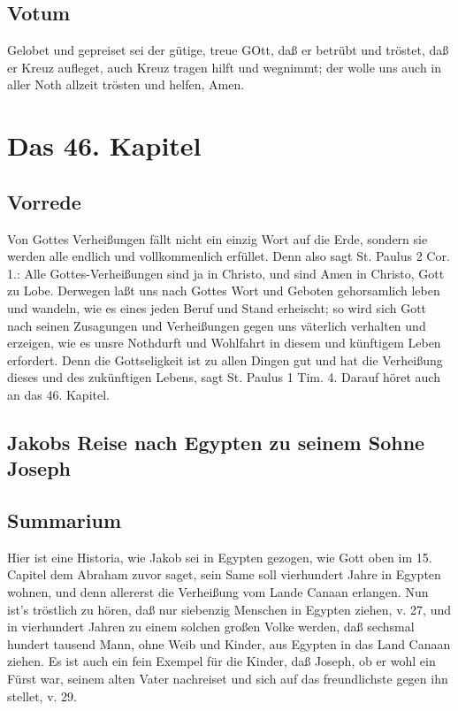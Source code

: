 \section{Votum}

Gelobet und gepreiset sei der gütige, treue GOtt, daß er betrübt und tröstet, daß er Kreuz aufleget, auch Kreuz tragen hilft und wegnimmt; der wolle uns auch in aller Noth allzeit trösten und helfen, Amen.

\chapter{Das 46. Kapitel}

\section{Vorrede}

Von Gottes Verheißungen fällt nicht ein einzig Wort auf die Erde, sondern sie werden alle endlich und vollkommenlich erfüllet. Denn also sagt St. Paulus 2 Cor. 1.: Alle Gottes-Verheißungen sind ja in Christo, und sind Amen in Christo, Gott zu Lobe. Derwegen laßt uns nach Gottes Wort und Geboten gehorsamlich leben und wandeln, wie es eines jeden Beruf und Stand erheischt; so wird sich Gott nach seinen Zusagungen und Verheißungen gegen uns väterlich verhalten und erzeigen, wie es unsre Nothdurft und Wohlfahrt in diesem und künftigem Leben erfordert. Denn die Gottseligkeit ist zu allen Dingen gut und hat die Verheißung dieses und des zukünftigen Lebens, sagt St. Paulus 1 Tim. 4. Darauf höret auch an das 46. Kapitel.

\section{Jakobs Reise nach Egypten zu seinem Sohne Joseph}

\section{Summarium}

Hier ist eine Historia, wie Jakob sei in Egypten gezogen, wie Gott oben im 15. Capitel dem Abraham zuvor saget, sein Same soll vierhundert Jahre in Egypten wohnen, und denn allererst die Verheißung vom Lande Canaan erlangen. Nun ist’s tröstlich zu hören, daß nur siebenzig Menschen in Egypten ziehen, v. 27, und in vierhundert Jahren zu einem solchen großen Volke werden, daß sechsmal hundert tausend Mann, ohne Weib und Kinder, aus Egypten in das Land Canaan ziehen. Es ist auch ein fein Exempel für die Kinder, daß Joseph, ob er wohl ein Fürst war, seinem alten Vater nachreiset und sich auf das freundlichste gegen ihn stellet, v. 29.

